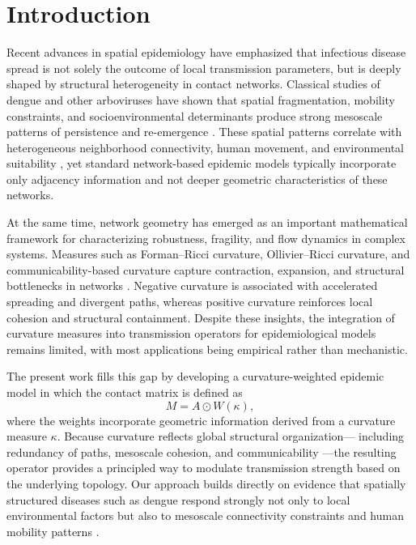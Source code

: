\documentclass[final,3p,times,twocolumn]{elsarticle}
\begin{document}


\section{Introduction}

Recent advances in spatial epidemiology have emphasized that infectious disease
spread is not solely the outcome of local transmission parameters, but is deeply
shaped by structural heterogeneity in contact networks. Classical studies of
dengue and other arboviruses have shown that spatial fragmentation, mobility
constraints, and socioenvironmental determinants produce strong mesoscale
patterns of persistence and re-emergence \cite{barcellos2001, honorio2009,
massaro2019, carvalho2021}. These spatial patterns correlate with heterogeneous
neighborhood connectivity, human movement, and environmental suitability
\cite{parselia2019, adeola2017}, yet standard network-based epidemic models
typically incorporate only adjacency information and not deeper geometric
characteristics of these networks.

At the same time, network geometry has emerged as an important mathematical
framework for characterizing robustness, fragility, and flow dynamics in complex
systems. Measures such as Forman--Ricci curvature, Ollivier--Ricci curvature,
and communicability-based curvature capture contraction, expansion, and
structural bottlenecks in networks \cite{Estrada2012, Estrada2025Curv,
de2021using}. Negative curvature is associated with accelerated spreading and
divergent paths, whereas positive curvature reinforces local cohesion and
structural containment. Despite these insights, the integration of curvature
measures into transmission operators for epidemiological models remains limited,
with most applications being empirical rather than mechanistic.

The present work fills this gap by developing a curvature-weighted epidemic
model in which the contact matrix is defined as
\[
    M = A \odot W(\kappa),
\]
where the weights incorporate geometric information derived from a curvature
measure $\kappa$. Because curvature reflects global structural organization—
including redundancy of paths, mesoscale cohesion, and communicability
\cite{Estrada2012, GrassBoada2025}—the resulting operator provides a principled
way to modulate transmission strength based on the underlying topology. Our
approach builds directly on evidence that spatially structured diseases such as
dengue respond strongly not only to local environmental factors but also to
mesoscale connectivity constraints and human mobility patterns \cite{teixeira2009,
zheng2019spatiotemporal, borges2024}.
\end{document}

